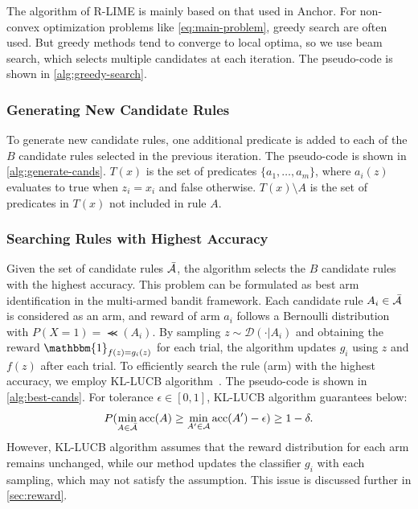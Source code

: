 \documentclass[runningheads]{llncs}
\begin{document}
{{  \begin{algorithm}[p]
    \small
    
  \end{algorithm}
}
The algorithm of R-LIME
is mainly based on that used in Anchor\cite{ribeiro2018anchors}.
For non-convex optimization problems like \cref{eq:main-problem},
greedy search are often used.
But greedy methods tend to converge to local optima,
so we use beam search, which selects multiple candidates at each iteration.
The pseudo-code is shown in \cref{alg:greedy-search}.

\subsubsection{Generating New Candidate Rules}
To generate new candidate rules,
one additional predicate is added to each of the $B$ candidate rules
selected in the previous iteration.
The pseudo-code is shown in \cref{alg:generate-cands}.
$T(x)$ is the set of predicates $\{a_1,\dots,a_m\}$,
where $a_i(z)$ evaluates to true when $z_i=x_i$ and false otherwise.
$T(x)\setminus A$ is the set of predicates in $T(x)$ not included in rule $A$.

\subsubsection{Searching Rules with Highest Accuracy}
Given the set of candidate rules $\bar{\mathcal{A}}$,
the algorithm selects the $B$ candidate rules with the highest accuracy.
This problem can be formulated
as best arm identification in the multi-armed bandit framework.
Each candidate rule $A_i\in\bar{\mathcal{A}}$ is considered as an arm,
and reward of arm $a_i$ follows a Bernoulli distribution
with $P(X=1)=\Prec(A_i)$.
By sampling $z\sim\mathcal{D}(\cdot|A_i)$
and obtaining the reward $\mathbbm{1}_{f(z)=g_i(z)}$ for each trial,
the algorithm updates $g_i$ using $z$ and $f(z)$ after each trial.
To efficiently search the rule (arm) with the highest accuracy,
we employ KL-LUCB algorithm~\cite{kaufmann2013information}.
The pseudo-code is shown in \cref{alg:best-cands}.
For tolerance $\epsilon\in[0,1]$, KL-LUCB algorithm guarantees below:
\begin{equation}
  P(\underset{A\in\bar{\mathcal{A}}}{\min}\operatorname{acc}(A)\ge
  \underset{A'\in\mathcal{A}}{\min}\operatorname{acc}(A')-\epsilon)\ge1-\delta.
\end{equation}
However,
KL-LUCB algorithm assumes that the reward distribution for each arm
remains unchanged,
while our method updates the classifier $g_i$ with each sampling,
which may not satisfy the assumption.
This issue is discussed further in \cref{sec:reward}.

}
\end{document}
